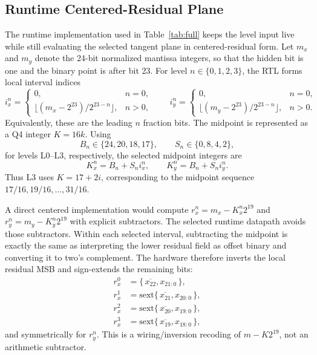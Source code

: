 \documentclass[conference]{IEEEtran}
\begin{document}
\subsection{Runtime Centered-Residual Plane}
The runtime implementation used in Table~\ref{tab:full} keeps the level input
live while still evaluating the selected tangent plane in centered-residual
form. Let $m_x$ and $m_y$ denote the 24-bit normalized mantissa integers, so
that the hidden bit is one and the binary point is after bit 23. For level
$n\in\{0,1,2,3\}$, the RTL forms local interval indices
\begin{equation}
 i_x^n =
 \begin{cases}
  0, & n=0,\\
  \lfloor(m_x-2^{23})/2^{23-n}\rfloor, & n>0,
 \end{cases}
 \qquad
 i_y^n =
 \begin{cases}
  0, & n=0,\\
  \lfloor(m_y-2^{23})/2^{23-n}\rfloor, & n>0.
 \end{cases}
\end{equation}
Equivalently, these are the leading $n$ fraction bits. The midpoint is
represented as a Q4 integer $K=16k$. Using
\begin{equation}
 B_n\in\{24,20,18,17\},\qquad S_n\in\{0,8,4,2\},
\end{equation}
for levels L0--L3, respectively, the selected midpoint integers are
\begin{equation}
 K_x^n=B_n+S_n i_x^n,\qquad K_y^n=B_n+S_n i_y^n .
\end{equation}
Thus L3 uses $K=17+2i$, corresponding to the midpoint sequence
$17/16,19/16,\ldots,31/16$.

A direct centered implementation would compute
$r_x^n=m_x-K_x^n2^{19}$ and $r_y^n=m_y-K_y^n2^{19}$ with explicit subtractors.
The selected runtime datapath avoids those subtractors. Within each selected
interval, subtracting the midpoint is exactly the same as interpreting the
lower residual field as offset binary and converting it to two's complement.
The hardware therefore inverts the local residual MSB and sign-extends the
remaining bits:
\begin{equation}
\begin{aligned}
 r_x^0 &= \{\,\overline{x_{22}},x_{21:0}\,\},\\
 r_x^1 &= \mathrm{sext}\{\,\overline{x_{21}},x_{20:0}\,\},\\
 r_x^2 &= \mathrm{sext}\{\,\overline{x_{20}},x_{19:0}\,\},\\
 r_x^3 &= \mathrm{sext}\{\,\overline{x_{19}},x_{18:0}\,\},
\end{aligned}
\label{eq:runtime_residual}
\end{equation}
and symmetrically for $r_y^n$. This is a wiring/inversion recoding of
$m-K2^{19}$, not an arithmetic subtractor.
\end{document}
